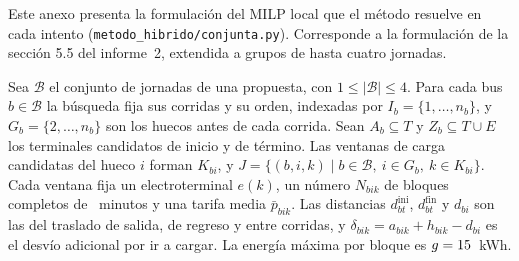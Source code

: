 Este anexo presenta la formulación del MILP local que el método resuelve en cada intento (\texttt{metodo\_hibrido/conjunta.py}). Corresponde a la formulación de la sección 5.5 del informe~2, extendida a grupos de hasta cuatro jornadas.

Sea \(\mathcal{B}\) el conjunto de jornadas de una propuesta, con \(1\le |\mathcal{B}|\le 4\). Para cada bus \(b\in \mathcal{B}\) la búsqueda fija sus corridas y su orden, indexadas por \(I_b=\{1,\dots,n_b\}\), y \(G_b=\{2,\dots,n_b\}\) son los huecos antes de cada corrida. Sean \(A_b\subseteq T\) y \(Z_b\subseteq T\cup E\) los terminales candidatos de inicio y de término. Las ventanas de carga candidatas del hueco \(i\) forman \(K_{bi}\), y \(J=\{(b,i,k)\mid b\in \mathcal{B},\ i\in G_b,\ k\in K_{bi}\}\). Cada ventana fija un electroterminal \(e(k)\), un número \(N_{bik}\) de bloques completos de \MinutosBloque~minutos y una tarifa media \(\bar p_{bik}\). Las distancias \(d^{\mathrm{ini}}_{bt}\), \(d^{\mathrm{fin}}_{bt}\) y \(d_{bi}\) son las del traslado de salida, de regreso y entre corridas, y \(\delta_{bik}=a_{bik}+h_{bik}-d_{bi}\) es el desvío adicional por ir a cargar. La energía máxima por bloque es \(g=15\)~kWh.

